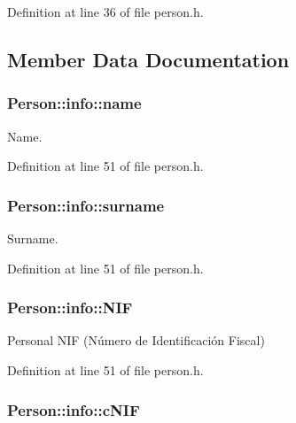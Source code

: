 Definition at line 36 of file person.\+h.



\subsection{Member Data Documentation}
\hypertarget{struct_person_1_1info_a81051c5b2abdf064395938f2f47017b8}{
\subsubsection[{name}]{\setlength{\rightskip}{0pt plus 5cm}Person\+::info\+::name}}\label{struct_person_1_1info_a81051c5b2abdf064395938f2f47017b8}


Name. 



Definition at line 51 of file person.\+h.

\hypertarget{struct_person_1_1info_a5dffef4c24ab24eaa62a3428e04b4239}{
\subsubsection[{surname}]{\setlength{\rightskip}{0pt plus 5cm}Person\+::info\+::surname}}\label{struct_person_1_1info_a5dffef4c24ab24eaa62a3428e04b4239}


Surname. 



Definition at line 51 of file person.\+h.

\hypertarget{struct_person_1_1info_ab91922388b5ba74969a7d8f7a4fad95b}{
\subsubsection[{N\+I\+F}]{\setlength{\rightskip}{0pt plus 5cm}Person\+::info\+::\+N\+I\+F}}\label{struct_person_1_1info_ab91922388b5ba74969a7d8f7a4fad95b}


Personal N\+I\+F (Número de Identificación Fiscal) 



Definition at line 51 of file person.\+h.

\hypertarget{struct_person_1_1info_a3ee6bcba23c2257f4571084e7a734e6d}{
\subsubsection[{c\+N\+I\+F}]{\setlength{\rightskip}{0pt plus 5cm}Person\+::info\+::c\+N\+I\+F}}\label{struct_person_1_1info_a3ee6bcba23c2257f4571084e7a734e6d}


